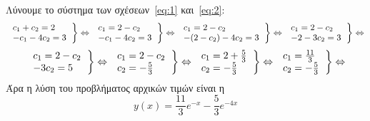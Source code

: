 \begin{enumerate}
Λύνουμε το σύστημα των σχέσεων~\eqref{eq:1} και~\eqref{eq:2}:
\[
		\left.
            \begin{tabular}{l}
            $c_{1}+ c_{2}=2 $ \\
            $-c_{1}- 4 c_{2}=3$
		\end{tabular}
    \right\} \Leftrightarrow 
		\left.
            \begin{tabular}{l}
            $c_{1}=2- c_{2} $ \\
            $-c_{1}- 4 c_{2}=3$
		\end{tabular}  
    \right\} \Leftrightarrow 
		\left.
            \begin{tabular}{l}
            $c_{1}=2- c_{2} $ \\
            $-(2- c_{2})- 4 c_{2}=3$
		\end{tabular}  
    \right\} \Leftrightarrow 
		\left.
            \begin{tabular}{l}
            $c_{1}=2- c_{2} $ \\
            $-2- 3c_{2}=3$
		\end{tabular}  
    \right\} \Leftrightarrow 
\]
\[
		\left.
            \begin{tabular}{l}
            $c_{1}=2- c_{2} $ \\
            $ -3c_{2}=5$
		\end{tabular}  
    \right\} \Leftrightarrow 
		\left.
            \begin{tabular}{l}
            $c_{1}=2- c_{2} $ \\
            $ c_{2}= -\frac{5}{3} $
		\end{tabular}  
    \right\} \Leftrightarrow 
		\left.
            \begin{tabular}{l}
                $c_{1}=2 + \frac{5}{3}  $ \\
            $ c_{2}= -\frac{5}{3} $
		\end{tabular}  
    \right\} \Leftrightarrow 
		\left.
            \begin{tabular}{l}
                $c_{1}= \frac{11}{3}  $ \\
            $ c_{2}= -\frac{5}{3} $
		\end{tabular}  
    \right\} \Leftrightarrow 
\] 
Άρα η λύση του προβλήματος αρχικών τιμών είναι η 
\[
    \boxed {  y(x)= \frac{11}{3} e^{-x} - \frac{5}{3} e^{-4x} }
\]




\end{enumerate}


